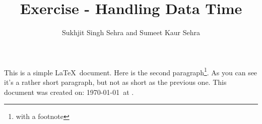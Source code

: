 \documentclass[12pt]{article}
\author{Sukhjit Singh Sehra and Sumeet Kaur Sehra}
\title{Exercise - Handling Data Time}
\begin{document}
\maketitle

This is a simple \LaTeX\ document.
Here is the second paragraph\footnote{with a footnote}. 
As you can see it's a rather short paragraph, but not 
as short as the previous one. This document was 
created on: \today\ at \currenttime.
\end{document}
